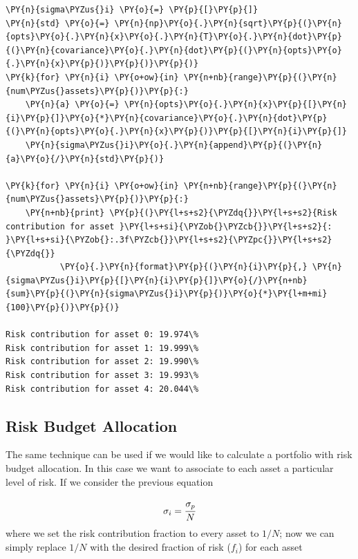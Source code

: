 \begin{tcolorbox}[breakable, size=fbox, boxrule=1pt, pad at break*=1mm,colback=cellbackground, colframe=cellborder]
\begin{Verbatim}[commandchars=\\\{\}]
\PY{n}{sigma\PYZus{}i} \PY{o}{=} \PY{p}{[}\PY{p}{]}
\PY{n}{std} \PY{o}{=} \PY{n}{np}\PY{o}{.}\PY{n}{sqrt}\PY{p}{(}\PY{n}{opts}\PY{o}{.}\PY{n}{x}\PY{o}{.}\PY{n}{T}\PY{o}{.}\PY{n}{dot}\PY{p}{(}\PY{n}{covariance}\PY{o}{.}\PY{n}{dot}\PY{p}{(}\PY{n}{opts}\PY{o}{.}\PY{n}{x}\PY{p}{)}\PY{p}{)}\PY{p}{)} 
\PY{k}{for} \PY{n}{i} \PY{o+ow}{in} \PY{n+nb}{range}\PY{p}{(}\PY{n}{num\PYZus{}assets}\PY{p}{)}\PY{p}{:}
    \PY{n}{a} \PY{o}{=} \PY{n}{opts}\PY{o}{.}\PY{n}{x}\PY{p}{[}\PY{n}{i}\PY{p}{]}\PY{o}{*}\PY{n}{covariance}\PY{o}{.}\PY{n}{dot}\PY{p}{(}\PY{n}{opts}\PY{o}{.}\PY{n}{x}\PY{p}{)}\PY{p}{[}\PY{n}{i}\PY{p}{]} 
    \PY{n}{sigma\PYZus{}i}\PY{o}{.}\PY{n}{append}\PY{p}{(}\PY{n}{a}\PY{o}{/}\PY{n}{std}\PY{p}{)}
		
\PY{k}{for} \PY{n}{i} \PY{o+ow}{in} \PY{n+nb}{range}\PY{p}{(}\PY{n}{num\PYZus{}assets}\PY{p}{)}\PY{p}{:}
    \PY{n+nb}{print} \PY{p}{(}\PY{l+s+s2}{\PYZdq{}}\PY{l+s+s2}{Risk contribution for asset }\PY{l+s+si}{\PYZob{}\PYZcb{}}\PY{l+s+s2}{: }\PY{l+s+si}{\PYZob{}:.3f\PYZcb{}}\PY{l+s+s2}{\PYZpc{}}\PY{l+s+s2}{\PYZdq{}}
           \PY{o}{.}\PY{n}{format}\PY{p}{(}\PY{n}{i}\PY{p}{,} \PY{n}{sigma\PYZus{}i}\PY{p}{[}\PY{n}{i}\PY{p}{]}\PY{o}{/}\PY{n+nb}{sum}\PY{p}{(}\PY{n}{sigma\PYZus{}i}\PY{p}{)}\PY{o}{*}\PY{l+m+mi}{100}\PY{p}{)}\PY{p}{)}

Risk contribution for asset 0: 19.974\%
Risk contribution for asset 1: 19.999\%
Risk contribution for asset 2: 19.990\%
Risk contribution for asset 3: 19.993\%
Risk contribution for asset 4: 20.044\%
\end{Verbatim}
\end{tcolorbox}


\subsection{Risk Budget Allocation}
\label{risk-budget-allocation}

The same technique can be used if we would like to calculate a portfolio
with risk budget allocation. In this case we want to associate to each asset a particular level of risk. If we consider the previous equation

\begin{equation} \sigma _{i}=\cfrac{\sigma_p}{N} \end{equation}
where we set the risk contribution fraction to every asset to \(1/N\);
now we can simply replace \(1/N\) with the desired fraction of risk (\(f_i\)) for each asset

